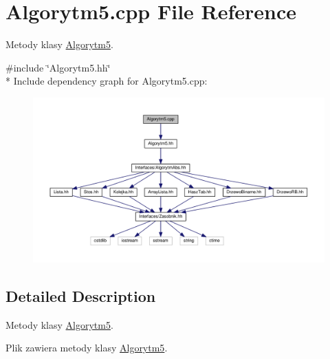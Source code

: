 \hypertarget{a00028}{}\section{Algorytm5.\+cpp File Reference}
\label{a00028}


Metody klasy \hyperlink{a00006}{Algorytm5}.  


{\ttfamily \#include \char`\"{}Algorytm5.\+hh\char`\"{}}\\*
Include dependency graph for Algorytm5.\+cpp\+:
\nopagebreak
\begin{figure}[H]
\begin{center}
\leavevmode
\includegraphics[width=350pt]{a00072}
\end{center}
\end{figure}


\subsection{Detailed Description}
Metody klasy \hyperlink{a00006}{Algorytm5}. 

Plik zawiera metody klasy \hyperlink{a00006}{Algorytm5}. 
